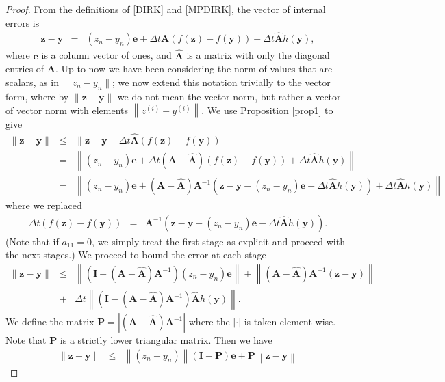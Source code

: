 \documentclass{siamart251104}
\newcommand{\dt}{\Delta t}
\newcommand{\m}[1]{\mathbf{#1}}
\newcommand{\vy}{\m{y}}
\newcommand{\vz}{\m{z}}
\newcommand{\vb}{\m{b}}
\newcommand{\ve}{\m{e}}
\newcommand{\mQ}{\m{P}} %
\newcommand{\mI}{\m{I}}
\newcommand{\mA}{\m{A}}
\newcommand{\mAh}{\m{\hat{A}}}
\begin{document}
\begin{proof}
From the definitions of \eqref{DIRK}
and \eqref{MPDIRK}, the  vector of 
internal errors is
\begin{eqnarray*} 
 \vz - \vy & = & \left(z_n - y_n\right) \ve  + \dt  \mA \left( f(\vz)  - f(\vy) \right) 
    + \dt \mAh h(\vy) ,
\end{eqnarray*}
where $\ve$ is a column vector of ones, and $\mAh$ is a matrix with only the diagonal entries of $\mA$. 
Up to now we have been considering the norm
of values that are scalars, as in $\|z_n - y_n\|$;
we now extend this notation trivially to the vector form, 
where by $\| \vz - \vy \|$  we do not mean
the vector norm, but rather a  vector of vector norm with elements 
$\left\| z^{(i)} - y^{(i)}\right\|$.
We use Proposition \ref{prop1} to give
\begin{eqnarray*}
\|  \vz - \vy  \| & \leq  &
\|  \vz - \vy - 
\dt \mAh (f(\vz)-f(\vy) )  \| \\
& =  & 
\left\| (z_n - y_n) \ve   
+ \dt (\mA - \mAh) (f(\vz)-f(\vy) )
+ \dt  \mAh h(\vy)  \right\| \\
& =  &
\left\|  (z_n - y_n) \ve +  (\mA- \mAh) \mA^{-1} \left(\vz - \vy -   (z_n - y_n) \ve  - \dt \mAh h(\vy) \right)  
+ \dt  \mAh h(\vy)  \right\|
\end{eqnarray*}
where we replaced
\begin{eqnarray*}
\dt  \left( f(\vz) - f(\vy) \right) &=& 
\mA^{-1} \left( \vz - \vy -   
(z_n - y_n) \ve - \dt \mAh h(\vy) \right) .
\end{eqnarray*} 
(Note that if  $a_{11} = 0$, we simply treat the first stage  
as explicit and proceed with the next stages.)
We proceed to bound the error at each stage
\begin{eqnarray*}
\|  \vz - \vy   \| & \leq  & 
\left\|  \left( \mI -(\mA- \mAh) \mA^{-1} \right)  (z_n - y_n) \ve    
\right\| 
+ \left\|   (\mA- \mAh) \mA^{-1}  
(\vz - \vy)    \right\| \\
& + & \dt \left\|   \left( 
\mI - (\mA - \mAh) \mA^{-1}   \right) \mAh h(\vy)    \right\|.
\end{eqnarray*}
We define the matrix 
$\mQ = \left| (\mA- \mAh) \mA^{-1} \right|$ where the 
$| \cdot |$ is taken element-wise. 
Note that $\mQ$  is a strictly lower triangular matrix.
Then we have 
\begin{eqnarray*}
\|   \vz - \vy   \| 
& \leq  & 
 \left\|(z_n - y_n) \right\|  \left(\mI + \mQ \right) \ve  
+ \mQ \left\| \vz - \vy    \right\|

\end{eqnarray*}
\end{proof}
\end{document}
